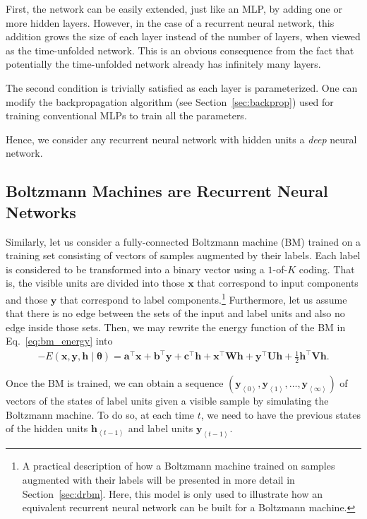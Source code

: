 \documentclass{now}
\newcommand{\qt}[1]{\left<#1\right>}
\newcommand{\vect}[1]{\mathbf{#1}}
\newcommand{\vects}[1]{\boldsymbol{#1}}
\newcommand{\matr}[1]{\mathbf{#1}}
\newcommand{\va}[0]{\vect{a}}
\newcommand{\vb}[0]{\vect{b}}
\newcommand{\vc}[0]{\vect{c}}
\newcommand{\vh}[0]{\vect{h}}
\newcommand{\vx}[0]{\vect{x}}
\newcommand{\vy}[0]{\vect{y}}
\newcommand{\mW}[0]{\matr{W}}
\newcommand{\mU}[0]{\matr{U}}
\newcommand{\mV}[0]{\matr{V}}
\newcommand{\TT}[0]{{\vects{\theta}}}
\begin{document}
First, the network can be easily extended, just like an MLP, by adding one or
more hidden layers. However, in the case of a recurrent neural network, this
addition grows the size of each layer instead of the number of layers, when
viewed as the time-unfolded network. This is an obvious consequence from the
fact that potentially the time-unfolded network already has infinitely many
layers.

The second condition is trivially satisfied as each layer is parameterized. One
can modify the backpropagation algorithm (see Section~\ref{sec:backprop}) used
for training conventional MLPs to train all the parameters.

Hence, we consider any recurrent neural network with hidden units a
\textit{deep} neural network. 

\subsection{Boltzmann Machines are Recurrent Neural Networks}

Similarly, let us consider a fully-connected Boltzmann machine (BM) trained on a
training set consisting of vectors of samples augmented by their labels. Each
label is considered to be transformed into a binary vector using a $1$-of-$K$
coding.  That is, the visible units are divided into those $\vx$ that correspond
to input components and those $\vy$ that correspond to label
components.\footnote{ 
    A practical description of how a Boltzmann machine trained on samples augmented
    with their labels will be presented in more detail in Section~\ref{sec:drbm}.
    Here, this model is only used to illustrate how an equivalent recurrent neural
    network can be built for a Boltzmann machine.
}
Furthermore, let us assume that there is no edge between the sets of the input
and label units and also no edge inside those sets. Then, we may rewrite the
energy function of the BM in Eq.~\eqref{eq:bm_energy} into
\begin{align}
    \label{eq:disbm_energy}
    -E(\vx, \vy, \vh \mid \TT) = \va^\top \vx + \vb^\top \vy
    + \vc^\top \vh + \vx^\top \mW \vh + \vy^\top \mU \vh +
    \frac{1}{2} \vh^\top \mV \vh.
\end{align}

Once the BM is trained, we can obtain a sequence $\left( \vy_{\qt{0}},
\vy_{\qt{1}}, \dots, \vy_{\qt{\infty}} \right)$ of vectors of the states of
label units given a visible sample by simulating the Boltzmann machine.  To do
so, at each time $t$, we need to have the previous states of the hidden units
$\vh_{\qt{t-1}}$ and label units $\vy_{\qt{t-1}}$. 
\end{document}
